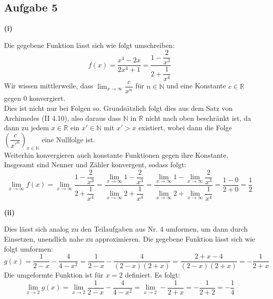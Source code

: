 \documentclass[a4paper,graphics,11pt]{article}
\newcommand{\aufgabe}[1]{\subsection*{Aufgabe #1}}
\begin{document}
\newpage

\aufgabe{5}
\textbf{(i)}

Die gegebene Funktion lässt sich wie folgt umschreiben:
$$
    f(x) = \frac{x^4-2x}{2x^4+1} = \frac{1-\dfrac{2}{x^3}}{2+\dfrac{1}{x^4}}
$$
Wir wissen mittlerweile, dass $\lim_{x \to \infty}\limits \dfrac{c}{x^n}$ für
$n \in \mathbb{N}$ und eine Konstante $c \in \mathbb{R}$ gegen 0 konvergiert.\\[2pt]
Dies ist nicht nur bei Folgen so.
Grundsätzlich folgt dies aus dem Satz von Archimedes (II 4.10), also
daraus dass $\mathbb{N}$ in $\mathbb{R}$ nicht nach oben beschränkt ist, da dann
zu jedem $x \in \mathbb{R}$ ein $x' \in \mathbb{N}$ mit $x'>x$ existiert, wobei
dann die Folge $\left(\dfrac{c}{x'^n}\right)_{x \in \mathbb{N}}$ eine Nullfolge ist.\\[2pt]
Weiterhin konvergieren auch konstante Funktionen gegen ihre Konstante.
Insgesamt sind Nenner und Zähler konvergent, sodass folgt:
$$
    \lim_{x \to \infty} f(x)
    = \lim_{x \to \infty} \frac{1-\dfrac{2}{x^3}}{2+\dfrac{1}{x^4}}
    = \frac{\lim_{x \to \infty}\limits 1 - \dfrac{2}{x^3}}{\lim_{x \to \infty}\limits 2+\dfrac{1}{x^4}} 
    = \frac{\lim_{x \to \infty}\limits 1 - \lim_{x \to \infty}\limits \dfrac{2}{x^3}}
        {\lim_{x \to \infty}\limits 2 + \lim_{x \to \infty}\limits \dfrac{1}{x^4}}
    = \frac{1-0}{2+0} = \frac{1}{2}
$$

\textbf{(ii)}

Dies lässt sich analog zu den Teilaufgaben aus Nr. 4 umformen, um dann durch Einsetzen,
unendlich nahe zu approximieren. Die gegebene Funktion lässt sich wie folgt umformen:
$$
    g(x) = \frac{1}{2-x} - \frac{4}{4-x^2}
    = \frac{1}{2-x} - \frac{4}{(2-x)(2+x)}
    = \frac{2+x-4}{(2-x)(2+x)}
    = -\frac{1}{2+x}
$$
Die umgeformte Funktion ist für $x=2$ definiert. Es folgt:
$$
    \lim_{x \to 2} g(x)
    = \lim_{x \to 2} \frac{1}{2-x} - \frac{4}{4-x^2}
    = \lim_{x \to 2} - \frac{1}{2+x}
    = - \frac{1}{2+2}
    = -\frac{1}{4}
$$
\end{document}
